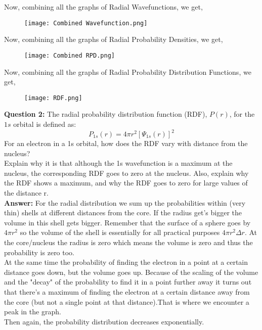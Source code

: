 \documentclass[11pt]{article}
\begin{document}
Now, combining all the graphs of Radial Wavefunctions, we get,\\[16pt]

	\begin{figure}[H]
	\centering
	\texttt{[image: Combined Wavefunction.png]}
\end{figure}
Now, combining all the graphs of Radial Probability Densities, we get,\\
	\begin{figure}[H]
	\centering
	\texttt{[image: Combined RPD.png]}
\end{figure}
Now, combining all the graphs of Radial Probability Distribution Functions, we get,\\

	\begin{figure}[H]
	\centering
	\texttt{[image: RDF.png]}
\end{figure}

\pagebreak

\textbf{Question 2: }The radial probability distribution function (RDF), $P(r)$, for the $1s$ orbital is defined as: $$P_{1s}(r) = 4\pi r^{2} [\Psi_{1s}(r)]^{2}$$
For an electron in a 1s orbital, how does the RDF vary with distance from the nucleus?\\
Explain why it is that although the 1s wavefunction is a maximum at the nucleus, the
corresponding RDF goes to zero at the nucleus. Also, explain why the RDF shows a maximum, 
and why the RDF goes to zero for large values of the distance r.\\[16pt]

\textbf{Answer: }For the radial distribution we sum up the probabilities within (very thin) shells at different distances from the core. If the radius get's bigger the volume in this shell gets bigger. Remember that the surface of a sphere goes by $4\pi r^{2}$ so the volume of the shell is essentially for all practical purposes $4 \pi r^{2} \Delta r$. At the core/nucleus the radius is zero which means the volume is zero and thus the probability is zero too.\\
At the same time the probability of finding the electron in a point at a certain distance goes down, but the volume goes up. Because of the scaling of the volume and the "decay" of the probability to find it in a point further away it turns out that there's a maximum of finding the electron at a certain distance away from the core (but not a single point at that distance).That is where we encounter a peak in the graph.\\
Then again, the probability distribution decreases exponentially.\\
\end{document}

